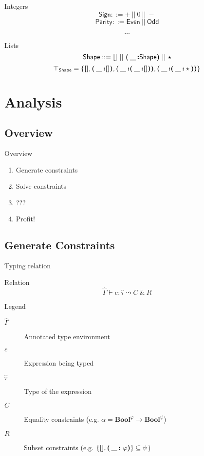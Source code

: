 \documentclass{beamer}
\newcommand{\tauhat}{\widehat{\tau}}
\newcommand{\also}{\ \&\ }
\newcommand{\TypeRel}[5][\widehat\Gamma]{#1 \vdash #2 : #3 \leadsto #4 \also #5}
\newcommand{\Bool}{\textbf{Bool}}
\newcommand{\Nill}{\textbf{[]}}
\newcommand{\Conss}[1]{\textbf{(\,\_\,:}#1\textbf{)}}
\begin{document}
\begin{frame}{Integers}
\[ \mathsf{Sign} ::= +\ ||\ 0\ ||\ - \]
\pause
\[ \mathsf{Parity} ::= \mathsf{Even}\ ||\ \mathsf{Odd} \]

\[ \ldots \]
\end{frame}

\begin{frame}{Lists}
\[ \mathsf{Shape} ::= \Nill\ ||\ \Conss{\mathsf{Shape}}\ ||\ \star \]
\pause
\[ \top_\mathsf{Shape} = \{ \Nill, \Conss{\Nill}, \Conss{\Conss{\Nill}}, \Conss{\Conss{\star}} \} \]
\end{frame}

\section{Analysis} %

\subsection{Overview}

\begin{frame}{Overview}
\begin{enumerate}
\item Generate constraints
\item Solve constraints
\item ???
\item Profit!
\end{enumerate}
\end{frame}

\subsection{Generate Constraints}

\begin{frame}{Typing relation}
\begin{block}{Relation}
\vfill
\[ \TypeRel{e}{\tauhat}{C}{R} \]
\vfill
\end{block}
\begin{block}{Legend}
\vfill
\begin{description}
\item[$\widehat\Gamma$] \quad Annotated type environment
\item[$e$]              \quad Expression being typed
\item[$\tauhat$]        \quad Type of the expression
\item[$C$]              \quad Equality constraints (e.g. $\alpha = \Bool^\varphi \to \Bool^\psi$)
\item[$R$]              \quad Subset constraints (e.g. $\{ \Nill, \Conss{\ \varphi} \} \subseteq \psi$)
\end{description}
\vfill
\end{block}
\end{frame}
\end{document}
